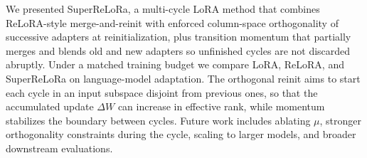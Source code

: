 We presented SuperReLoRa, a multi-cycle LoRA method that combines ReLoRA-style merge-and-reinit with enforced column-space orthogonality of successive adapters at reinitialization, plus transition momentum that partially merges and blends old and new adapters so unfinished cycles are not discarded abruptly.
Under a matched training budget we compare LoRA, ReLoRA, and SuperReLoRa on language-model adaptation.
The orthogonal reinit aims to start each cycle in an input subspace disjoint from previous ones, so that the accumulated update $\Delta W$ can increase in effective rank, while momentum stabilizes the boundary between cycles.
Future work includes ablating $\mu$, stronger orthogonality constraints during the cycle, scaling to larger models, and broader downstream evaluations.
